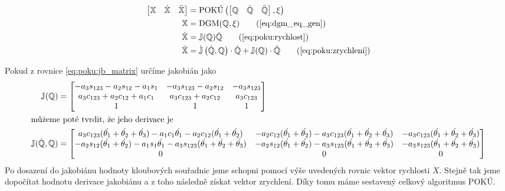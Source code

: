 \documentclass{article}
\begin{document}
				\begin{align}
					\begin{bmatrix}
						\mathbb{X} & \dot{\mathbb{X}} & \Ddot{\mathbb{X}} \\
					\end{bmatrix} &= \textnormal{POKÚ}\left( \begin{bmatrix}
						\mathbb{Q} & \dot{\mathbb{Q}} & \Ddot{\mathbb{Q}} \\
					\end{bmatrix}, \xi \right) \label{eq:poku:gen} \\
					\mathbb{X} &= \textnormal{DGM}(\mathbb{Q}, \xi) \tag{\ref{eq:dgm_eq_gen}} \\
					\dot{\mathbb{X}} &= \mathbb{J}(\mathbb{Q})\dot{\mathbb{Q}} \tag{\ref{eq:poku:rychlost}}\\
					\Ddot{\mathbb{X}} &= \dot{\mathbb{J}}\left(\dot{\mathbb{Q}},\mathbb{Q}\right)\cdot\dot{\mathbb{Q}} + \mathbb{J}(\mathbb{Q})\cdot\Ddot{\mathbb{Q}} \tag{\ref{eq:poku:zrychleni}}
				\end{align}
		
			\noindent Pokud z rovnice \eqref{eq:poku:jb_matrix} určíme jakobián jako
				\begin{align}
					\mathbb{J}(\mathbb{Q}) &= \begin{bmatrix}
						-a_3s_{123}-a_2s_{12}-a_1s_1 & -a_3s_{123}-a_2s_{12} & -a_3s_{123} \\
						a_3c_{123}+a_2c_{12}+a_1c_1 & a_3c_{123}+a_2c_{12} & a_3c_{123} \\
						1 & 1 & 1 \\
					\end{bmatrix} \label{eq:jacobian} \\
					\intertext{můžeme poté tvrdit, že jeho derivace je} 		
					\mathbb{J}(\mathbb{\dot{Q}},\mathbb{Q}) &= \begin{bmatrix}				a_3c_{123}(\dot{\theta_1}+\dot{\theta_2}+\dot{\theta_3})-a_1c_1\dot{\theta_1}-a_2c_{12}(\dot{\theta_1}+\dot{\theta_2}) & -a_2c_{12}(\dot{\theta_1}+\dot{\theta_2})-a_3c_{123}(\dot{\theta_1}+\dot{\theta_2}+\dot{\theta_3})
					& -a_3c_{123}(\dot{\theta_1}+\dot{\theta_2}+\dot{\theta_3})\\
					-a_2s_{12}(\dot{\theta_1}+\dot{\theta_2})-a_1s_1\dot{\theta_1}-a_3s_{123}(\dot{\theta_1}+\dot{\theta_2}+\dot{\theta_3})&-a_2s_{12}(\dot{\theta_1}+\dot{\theta_2})-a_3s_{123}(\dot{\theta_1}+\dot{\theta_2}+\dot{\theta_3})& -a_3s_{123}(\dot{\theta_1}+\dot{\theta_2}+\dot{\theta_3})\\
					0	&0	&0
					\end{bmatrix} \label{eq:diffjacobian}\\
				\end{align}
			Po dosazení do jakobiánu hodnoty kloubových souřadnic jsme schopni pomocí výše uvedených rovnic vektor rychlosti $\dot{X}$. Stejně tak jsme dopočítat hodnotu derivace jakobiánu a z toho následně získat vektor zrychlení. Díky tomu máme sestavený celkový algoritmus POKÚ.
\end{document}
